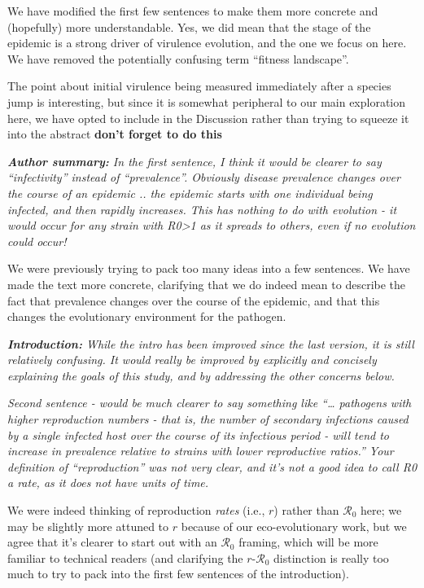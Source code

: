 \documentclass[10pt]{letter}
\newcommand{\revcomment}[1]{\emph{#1}}
\newcommand{\response}[1]{#1}
\newcommand{\rzero}{\ensuremath{\mathcal R}_0}
\newcommand{\todo}[1]{{\color{red} \bf #1}}
\begin{document}
\begin{letter}{
}
\response{We have modified the first few sentences to make them
more concrete and (hopefully) more understandable. 
Yes, we did mean that the stage of the epidemic is a strong
driver of virulence evolution, and the one we focus on here.
We have removed the potentially confusing term ``fitness landscape''.

The point about initial virulence being measured immediately after
a species jump is interesting, but since it is somewhat peripheral
to our main exploration here, we have opted to include in the 
Discussion rather than trying to squeeze it into the abstract
\todo{don't forget to do this}
}

\revcomment{
\textbf{Author summary:} In the first sentence, I think it would be clearer to say “infectivity” instead of “prevalence”. Obviously disease prevalence changes over the course of an epidemic .. the epidemic starts with one individual being infected, and then rapidly increases. This has nothing to do with evolution - it would occur for any strain with R0>1 as it spreads to others, even if no evolution could occur!
}

\response{We were previously trying to pack too many ideas into a few sentences. We have made the text more concrete, clarifying that we do indeed mean to describe the fact that prevalence changes over the course of the epidemic, and that this changes the evolutionary environment for the pathogen.}

\revcomment{\textbf{Introduction:}
While the intro has been improved since the last version, it is still relatively confusing. It would really be improved by explicitly and concisely explaining the goals of this study, and by addressing the other concerns below.
}

\revcomment{
Second sentence - would be much clearer to say something like “… pathogens with higher reproduction numbers - that is, the number of secondary infections caused by a single infected host over the course of its infectious period - will tend to increase in prevalence relative to strains with lower reproductive ratios.” Your definition of “reproduction” was not very clear, and it’s not a good idea to call R0 a rate, as it does not have units of time.
}

\response{
We were indeed thinking of reproduction \emph{rates} (i.e., $r$) rather than $\rzero$ here; we may be slightly more
attuned to $r$ because of our eco-evolutionary work, but we agree that it's clearer to start out with an $\rzero$
framing, which will be more familiar to technical readers (and clarifying the $r$-$\rzero$ distinction is really too much to try to pack into the first few sentences of the introduction).
}


\end{letter}
\end{document}
